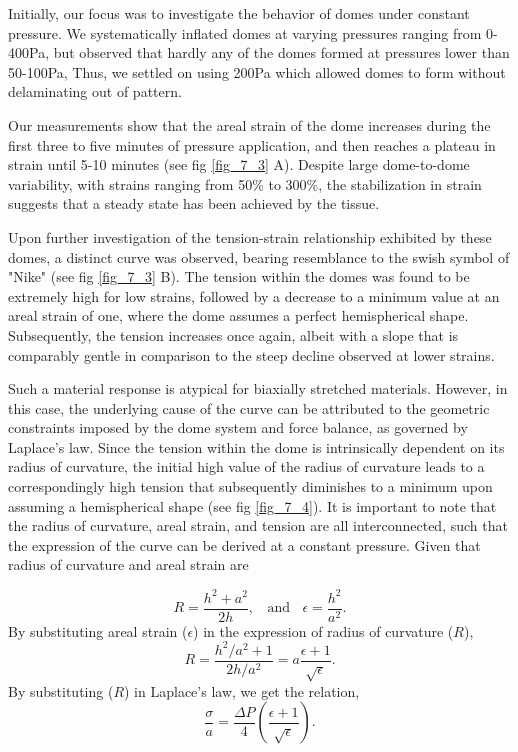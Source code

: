 Initially, our focus was to investigate the behavior of domes under constant pressure. We systematically inflated domes at varying pressures ranging from 0-400\unit{\pascal}, but observed that hardly any of the domes formed at pressures lower than 50-100\unit{\pascal}, Thus, we settled on using 200\unit{\pascal} which allowed domes to form without delaminating out of pattern.

Our measurements show that the areal strain of the dome increases during the first three to five minutes of pressure application, and then reaches a plateau in strain until 5-10 minutes (see fig \ref{fig_7_3} A). Despite large dome-to-dome variability, with strains ranging from 50\% to 300\%, the stabilization in strain suggests that a steady state has been achieved by the tissue.

Upon further investigation of the tension-strain relationship exhibited by these domes, a distinct curve was observed, bearing resemblance to the swish symbol of "Nike" (see fig \ref{fig_7_3} B). The tension within the domes was found to be extremely high for low strains, followed by a decrease to a minimum value at an areal strain of one, where the dome assumes a perfect hemispherical shape. Subsequently, the tension increases once again, albeit with a slope that is comparably gentle in comparison to the steep decline observed at lower strains.

Such a material response is atypical for biaxially stretched materials. However, in this case, the underlying cause of the curve can be attributed to the geometric constraints imposed by the dome system and force balance, as governed by Laplace's law. Since the tension within the dome is intrinsically dependent on its radius of curvature, the initial high value of the radius of curvature leads to a correspondingly high tension that subsequently diminishes to a minimum upon assuming a hemispherical shape (see fig \ref{fig_7_4}). It is important to note that the radius of curvature, areal strain, and tension are all interconnected, such that the expression of the curve can be derived at a constant pressure. Given that radius of curvature and areal strain are

$$ R = \frac{h^2 + a^2}{2h}, \ \ \ \ \text{and} \ \ \ \ \epsilon = \frac{h^2}{a^2}.$$
By substituting areal strain ($\epsilon$) in the expression of radius of curvature ($R$),
$$ R = \frac{h^2/a^2 + 1}{2h/a^2} = a\frac{\epsilon + 1}{\sqrt{\epsilon}}.$$
By substituting ($R$) in Laplace’s law, we get the relation,
$$ \frac{\sigma}{a} = \frac{\Delta P}{4} \left( \frac{\epsilon + 1}{\sqrt{\epsilon}} \right).$$

